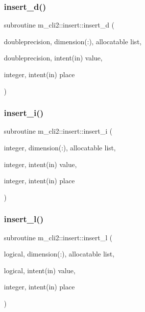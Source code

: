 \mbox{\label{interfacem__cli2_1_1insert_afbcad9e7123fdec1b5c996adc6076a26}} 
\subsubsection{\texorpdfstring{insert\+\_\+d()}{insert\_d()}}
{\footnotesize\ttfamily subroutine m\+\_\+cli2\+::insert\+::insert\+\_\+d (\begin{DoxyParamCaption}\item[{doubleprecision, dimension(\+:), allocatable}]{list,  }\item[{doubleprecision, intent(in)}]{value,  }\item[{integer, intent(in)}]{place }\end{DoxyParamCaption})\hspace{0.3cm}{\ttfamily [private]}}

\mbox{\label{interfacem__cli2_1_1insert_a50fcaf89ea5907952b521845dd434835}} 
\subsubsection{\texorpdfstring{insert\+\_\+i()}{insert\_i()}}
{\footnotesize\ttfamily subroutine m\+\_\+cli2\+::insert\+::insert\+\_\+i (\begin{DoxyParamCaption}\item[{integer, dimension(\+:), allocatable}]{list,  }\item[{integer, intent(in)}]{value,  }\item[{integer, intent(in)}]{place }\end{DoxyParamCaption})\hspace{0.3cm}{\ttfamily [private]}}

\mbox{\label{interfacem__cli2_1_1insert_a48dedb7035fb157485c81de9fc245659}} 
\subsubsection{\texorpdfstring{insert\+\_\+l()}{insert\_l()}}
{\footnotesize\ttfamily subroutine m\+\_\+cli2\+::insert\+::insert\+\_\+l (\begin{DoxyParamCaption}\item[{logical, dimension(\+:), allocatable}]{list,  }\item[{logical, intent(in)}]{value,  }\item[{integer, intent(in)}]{place }\end{DoxyParamCaption})\hspace{0.3cm}{\ttfamily [private]}}

